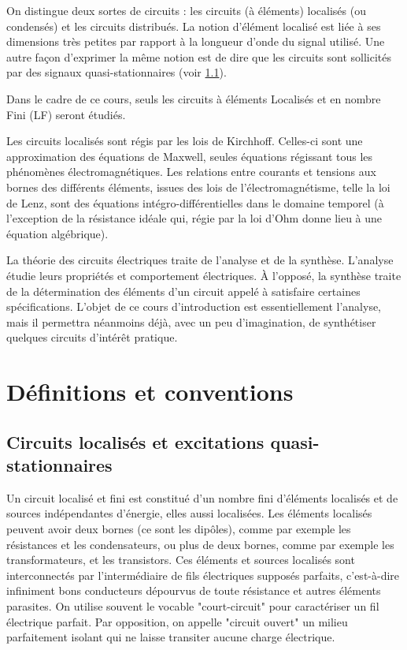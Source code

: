 On distingue deux sortes de circuits : les circuits (à éléments) localisés (ou condensés) et les circuits distribués. La notion d'élément localisé est liée à ses dimensions très petites par rapport à la longueur d'onde du signal utilisé. Une autre façon d'exprimer la même notion est de dire que les circuits sont sollicités par des signaux quasi-stationnaires (voir \ref{sec:circuits_localises}). 

Dans le cadre de ce cours, seuls les circuits à éléments Localisés et en nombre Fini (LF) seront étudiés. 

Les circuits localisés sont régis par les lois de Kirchhoff. Celles-ci sont une approximation des équations de Maxwell, seules équations régissant tous les phénomènes électromagnétiques. Les relations entre courants et tensions aux bornes des différents éléments, issues des lois de l'électromagnétisme, telle la loi de Lenz, sont des équations intégro-différentielles dans le domaine temporel (à l'exception de la résistance idéale qui, régie par la loi d'Ohm donne lieu à une équation algébrique).


La théorie des circuits électriques traite de l'analyse et de la synthèse. L'analyse étudie leurs propriétés et comportement électriques. À l'opposé, la synthèse traite de la détermination des éléments d'un circuit appelé à satisfaire certaines spécifications. L'objet de ce cours d'introduction est essentiellement l'analyse, mais il permettra néanmoins déjà, avec un peu d'imagination, de synthétiser quelques circuits d'intérêt pratique. 

\section{Définitions et conventions}

\subsection{Circuits localisés et excitations quasi-stationnaires}
\label{sec:circuits_localises}
Un circuit localisé et fini est constitué d'un nombre fini d'éléments localisés et de sources indépendantes d'énergie, elles aussi localisées. Les éléments localisés peuvent avoir deux bornes (ce sont les dipôles), comme par exemple les résistances et les condensateurs, ou plus de deux bornes, comme par exemple les transformateurs, et les transistors. Ces éléments et sources localisés sont interconnectés par l'intermédiaire de fils électriques supposés parfaits, c'est-à-dire infiniment bons conducteurs dépourvus de toute résistance et autres éléments parasites. On utilise souvent le vocable "court-circuit" pour caractériser un fil électrique parfait. Par opposition, on appelle "circuit ouvert" un milieu parfaitement isolant qui ne laisse transiter aucune charge électrique.

